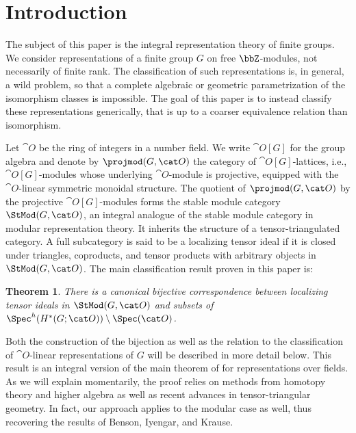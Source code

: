 \documentclass{amsart}%
\numberwithin{equation}{section}%
\newtheorem*{Thm*}{Theorem}
\theoremstyle{remark}
\begin{document}
\tableofcontents
\vspace{-1em}

\section{Introduction}

The subject of this paper is the integral representation theory of finite groups. We consider representations of a finite group $G$ on free $\bbZ$-modules, not necessarily of finite rank. The classification of such representations is, in general, a wild problem, so that a complete algebraic or geometric parametrization of the isomorphism classes is impossible. The goal of this paper is to instead classify these representations generically, that is up to a coarser equivalence relation than isomorphism. 

Let $\cat O$ be the ring of integers in a number field. We write $\cat O[G]$ for the group algebra and denote by $\projmod(G,\cat O)$ the category of $\cat O[G]$-lattices, i.e., $\cat O[G]$-modules whose underlying $\cat O$-module is projective, equipped with the $\cat O$-linear symmetric monoidal structure. The quotient of $\projmod(G,\cat O)$ by the projective $\cat O[G]$-modules forms the stable module category $\StMod(G,\cat O)$, an integral analogue of the stable module category in modular representation theory. It inherits the structure of a tensor-triangulated category. A full subcategory  is said to be a localizing tensor ideal if it is closed under triangles, coproducts, and tensor products with arbitrary objects in $\StMod(G,\cat O)$. The main classification result proven in this paper is:

\begin{Thm*}\label{thm:main}
There is a canonical bijective correspondence between localizing tensor ideals in $\StMod(G,\cat O)$ and subsets of $\Spec^h(H^*(G;\cat O))\setminus\Spec(\cat O)$.
\end{Thm*}

Both the construction of the bijection as well as the relation to the classification of $\cat O$-linear representations of $G$ will be described in more detail below. This result is an integral version of the main theorem of \cite{BensonIyengarKrause11a} for representations over fields. As we will explain momentarily, the proof relies on methods from homotopy theory and higher algebra as well as recent advances in tensor-triangular geometry. In fact, our approach applies to the modular case as well, thus recovering the results of Benson, Iyengar, and Krause.
\end{document}
